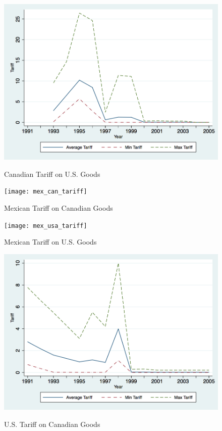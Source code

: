 \documentclass[a4paper,12pt]{article}
\begin{document}
{\begin{figure}[htpb]\centering
\caption{Canadian Tariff on U.S. Goods}\vspace{0.2cm}
\includegraphics[scale=0.35]{can_usa_tariff}
\label{fig:can_usa}
\end{figure}

\newpage

\begin{figure}[htpb]\centering
\caption{\small Mexican Tariff on Canadian Goods}\vspace{0.2cm}
\texttt{[image: mex\_can\_tariff]}
\label{fig:mex_can}
\end{figure}

\begin{figure}[htpb]\centering
\caption{\small Mexican Tariff on U.S. Goods}\vspace{0.2cm}
\texttt{[image: mex\_usa\_tariff]}
\label{fig:mex_usa}
\end{figure}

\newpage

\begin{figure}[htpb]\centering
\caption{\small U.S. Tariff on Canadian Goods}\vspace{0.2cm}
\includegraphics[scale=0.35]{usa_can_tariff}
\label{fig:usa_can}
\end{figure}
 
}
\end{document}

